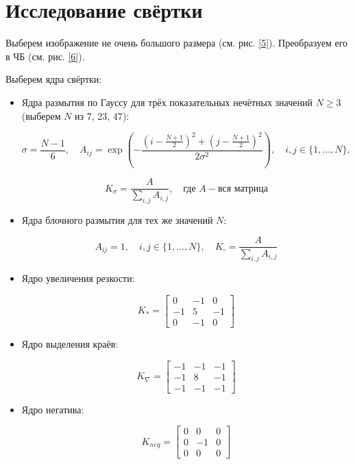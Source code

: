 \section{Исследование свёртки}
Выберем изображение не очень большого размера (см. рис. \ref{5}).
Преобразуем его в ЧБ (см. рис. \ref{6}).

Выберем ядра свёртки:

\begin{itemize}
    \item Ядра размытия по Гауссу для трёх показательных нечётных значений \( N \geq 3 \) (выберем $N$ из {7, 23, 47}):
    
    \[\sigma = \frac{N - 1}{6}, \quad A_{ij} = \exp\left(-\frac{(i - \frac{N + 1}{2})^2 + (j - \frac{N + 1}{2})^2}{2\sigma^2}\right), \quad i, j \in \{1, \ldots, N\},\]
    
    \[K_\sigma = \frac{A}{\sum_{i,j} A_{i,j}}, \quad \text{где } A - \text{вся матрица}\]

    \item Ядра блочного размытия для тех же значений \( N \):
    
    \[A_{ij} = 1, \quad i, j \in \{1, \ldots, N\}, \quad K_\square = \frac{A}{\sum_{i,j} A_{i,j}}\]

    \item Ядро увеличения резкости:
    
    \[K_* = 
    \begin{bmatrix}
    0 & -1 & 0 \\
    -1 & 5 & -1 \\
    0 & -1 & 0
    \end{bmatrix}\]

    \item Ядро выделения краёв:
    
    \[K_\nabla = 
    \begin{bmatrix}
    -1 & -1 & -1 \\
    -1 & 8 & -1 \\
    -1 & -1 & -1
    \end{bmatrix}\]

    \item Ядро негатива:

    \[K_{neg} = 
    \begin{bmatrix}
    0 & 0 & 0 \\
    0 & -1 & 0 \\
    0 & 0 & 0
    \end{bmatrix}\]

\end{itemize}

